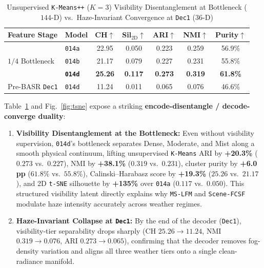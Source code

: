 \documentclass[journal,twoside]{IEEEtran}
\begin{document}
\begin{table}[t]
\centering
\caption{Unsupervised \texttt{K-Means++} ($K{=}3$) Visibility Disentanglement at Bottleneck ($144$-D) vs.\ Haze-Invariant Convergence at \texttt{Dec1} ($36$-D)}
\label{tab:manifold}
\renewcommand{\arraystretch}{1.15}
\setlength{\tabcolsep}{3.8pt}
\begin{tabular}{@{}llccccc@{}}
\toprule
\textbf{Feature Stage} & \textbf{Model} & \textbf{CH}$\uparrow$ & \textbf{Sil$_{2\mathrm{D}}$}$\uparrow$ & \textbf{ARI}$\uparrow$ & \textbf{NMI}$\uparrow$ & \textbf{Purity}$\uparrow$ \\
\midrule
\multirow{3}{*}{$1/4$ Bottleneck} & \texttt{014a} & 22.95 & 0.050 & 0.223 & 0.259 & 56.9\% \\
 & \texttt{014b} & 21.17 & 0.079 & 0.227 & 0.231 & 55.8\% \\
 & \textbf{\texttt{014d}} & \textbf{25.26} & \textbf{0.117} & \textbf{0.273} & \textbf{0.319} & \textbf{61.8\%} \\
\midrule
Pre-BASR \texttt{Dec1} & \texttt{014d} & 11.24 & 0.011 & 0.065 & 0.076 & 46.6\% \\
\bottomrule
\end{tabular}
\end{table}

Table~\ref{tab:manifold} and Fig.~\ref{fig:tsne} expose a striking \textbf{encode-disentangle / decode-converge duality}:
\begin{enumerate}
    \item \textbf{Visibility Disentanglement at the Bottleneck:} Even without visibility supervision, \texttt{014d}'s bottleneck separates Dense, Moderate, and Mist along a smooth physical continuum, lifting unsupervised \texttt{K-Means} ARI by \textbf{+20.3\%} ($0.273$ vs.\ $0.227$), NMI by \textbf{+38.1\%} ($0.319$ vs.\ $0.231$), cluster purity by \textbf{+6.0\,pp} ($61.8\%$ vs.\ $55.8\%$), Calinski--Harabasz score by \textbf{+19.3\%} ($25.26$ vs.\ $21.17$), and 2D \texttt{t-SNE} silhouette by \textbf{+135\%} over \texttt{014a} ($0.117$ vs.\ $0.050$). This structured visibility latent directly explains why \texttt{MS-LFM} and \texttt{Scene-FCSF} modulate haze intensity accurately across weather regimes.
    \item \textbf{Haze-Invariant Collapse at \texttt{Dec1}:} By the end of the decoder (\texttt{Dec1}), visibility-tier separability drops sharply (CH $25.26\to 11.24$, NMI $0.319\to 0.076$, ARI $0.273\to 0.065$), confirming that the decoder removes fog-density variation and aligns all three weather tiers onto a single clean-radiance manifold.
\end{enumerate}
\end{document}
